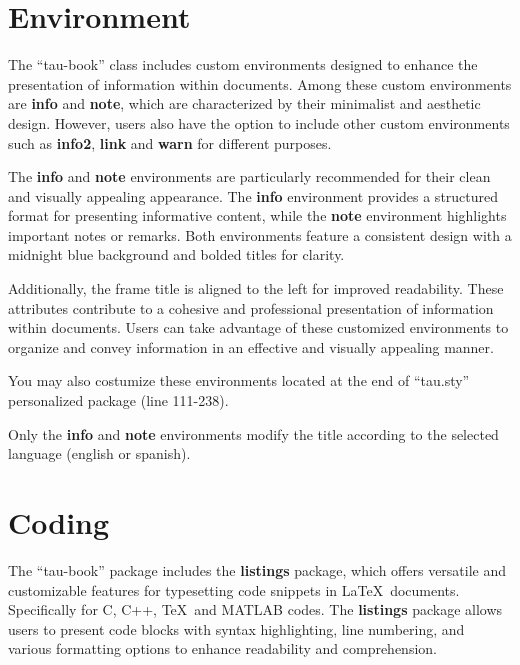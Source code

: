 \documentclass[10pt,a4paper,twoside]{tau-book}
\begin{document}
    \section{Environment}

        The ``tau-book'' class includes custom environments designed to enhance the presentation of information within documents. Among these custom environments are \textbf{info} and \textbf{note}, which are characterized by their minimalist and aesthetic design. However, users also have the option to include other custom environments such as \textbf{info2}, \textbf{link} and \textbf{warn} for different purposes. 

        The \textbf{info} and \textbf{note} environments are particularly recommended for their clean and visually appealing appearance. The \textbf{info} environment provides a structured format for presenting informative content, while the \textbf{note} environment highlights important notes or remarks. Both environments feature a consistent design with a midnight blue background and bolded titles for clarity.

        Additionally, the frame title is aligned to the left for improved readability. These attributes contribute to a cohesive and professional presentation of information within documents.  Users can take advantage of these customized environments to organize and convey information in an effective and visually appealing manner.

        You may also costumize these environments located at the end of ``tau.sty'' personalized package (line 111-238).

        \begin{note}
            Only the \textbf{info} and \textbf{note} environments modify the title according to the selected language (english or spanish).
        \end{note}

\section{Coding}

    The ``tau-book'' package includes the \textbf{listings} package, which offers versatile and customizable features for typesetting code snippets in \LaTeX\ documents. Specifically for C, C++, \TeX\ and MATLAB codes. The \textbf{listings} package allows users to present code blocks with syntax highlighting, line numbering, and various formatting options to enhance readability and comprehension.
\end{document}
